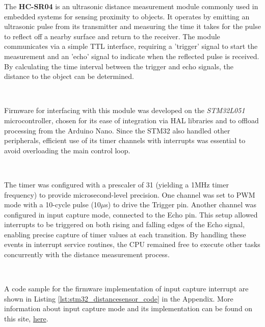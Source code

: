 \documentclass{article}
\begin{document}
The \textbf{HC-SR04} is an ultrasonic distance measurement module commonly used in embedded systems for sensing proximity to objects. It operates by emitting an ultrasonic pulse from its transmitter and measuring the time it takes for the pulse to reflect off a nearby surface and return to the receiver. The module communicates via a simple TTL interface, requiring a 'trigger' signal to start the measurement and an 'echo' signal to indicate when the reflected pulse is received. By calculating the time interval between the trigger and echo signals, the distance to the object can be determined.

\

Firmware for interfacing with this module was developed on the \emph{STM32L051} microcontroller, chosen for its ease of integration via HAL libraries and to offload processing from the Arduino Nano. Since the STM32 also handled other peripherals, efficient use of its timer channels with interrupts was essential to avoid overloading the main control loop.

\

The timer was configured with a prescaler of 31 (yielding a 1MHz timer frequency) to provide microsecond-level precision. One channel was set to PWM mode with a 10-cycle pulse (10$\mu$s) to drive the Trigger pin. Another channel was configured in input capture mode, connected to the Echo pin. This setup allowed interrupts to be triggered on both rising and falling edges of the Echo signal, enabling precise capture of timer values at each transition. By handling these events in interrupt service routines, the CPU remained free to execute other tasks concurrently with the distance measurement process.

\

A code sample for the firmware implementation of input capture interrupt are shown in Listing \ref{lst:stm32_distancesensor_code} in the Appendix. More information about input capture mode and its implementation can be found on this site, \href{https://community.st.com/t5/stm32-mcus/how-to-use-the-input-capture-feature/ta-p/704161}{here}.
\end{document}

